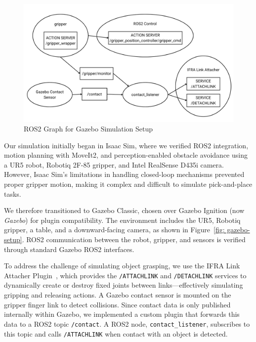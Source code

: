 \documentclass[12pt]{extarticle}
\begin{document}
\begin{figure}[h]
    \centering
    \includegraphics[width=\linewidth]{images/ros2_sim_graph.png}
    \caption{ROS2 Graph for Gazebo Simulation Setup}
    \label{fig: ros2-sim-graph}
\end{figure}

Our simulation initially began in Isaac Sim, where we verified ROS2 integration, motion planning with MoveIt2, and perception-enabled obstacle avoidance using a UR5 robot, Robotiq 2F-85 gripper, and Intel RealSense D435i camera. However, Isaac Sim’s limitations in handling closed-loop mechanisms prevented proper gripper motion, making it complex and difficult to simulate pick-and-place tasks.

We therefore transitioned to Gazebo Classic, chosen over Gazebo Ignition (now \textit{Gazebo}) for plugin compatibility. The environment includes the UR5, Robotiq gripper, a table, and a downward-facing camera, as shown in Figure~\ref{fig: gazebo-setup}. ROS2 communication between the robot, gripper, and sensors is verified through standard Gazebo ROS2 interfaces.

To address the challenge of simulating object grasping, we use the IFRA Link Attacher Plugin~\cite{ifra_link_attacher}, which provides the \texttt{/ATTACHLINK} and \texttt{/DETACHLINK} services to dynamically create or destroy fixed joints between links—effectively simulating gripping and releasing actions. A Gazebo contact sensor is mounted on the gripper finger link to detect collisions. Since contact data is only published internally within Gazebo, we implemented a custom plugin that forwards this data to a ROS2 topic \texttt{/contact}. A ROS2 node, \texttt{contact\_listener}, subscribes to this topic and calls \texttt{/ATTACHLINK} when contact with an object is detected.
\end{document}
